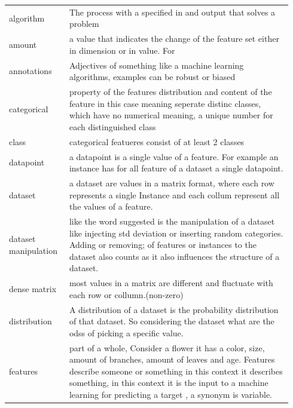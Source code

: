 \documentclass[a4paper,10pt]{article}
\begin{document}
\begin{tabular}{ p{0.20\linewidth} p{0.7437\linewidth} }
	
	
	algorithm & The process with a specified in and output that solves a problem\\ [1ex]
	
	amount & a value that indicates the change of the feature set either in dimension or in value. For \\[1ex]
	
	
	annotations & Adjectives of something like a machine learning algorithms, examples can be robust or biased\\ [1ex]
	
	categorical & property of the features distribution and content of the feature in this case meaning seperate distinc classes, which have no numerical meaning, a unique number for each distinguished class\\ [1ex]
	
	class	 & categorical featueres consist of at least 2 classes\\ [1ex]
	
	datapoint & a datapoint is a single value of a feature. For example an instance has for all feature of a dataset a single datapoint.\\[1ex]
	
	dataset & a dataset are values in a matrix format, where each row represents a single Instance and each collum represent all the values of a feature.\\ [1ex]
	
	dataset manipulation & like the word suggested is the manipulation of a dataset like injecting std deviation or inserting random categories. Adding or removing; of  features or instances to the dataset also counts as it also influences the structure of a dataset. \\ [1ex]
	
	dense matrix & most values in a matrix are different and fluctuate with each row or collumn.(non-zero)\\ [1ex]
	
	distribution & A distribution of a dataset is the probability distribution of that dataset. So considering the dataset what are the odss of picking a specific value. \\ [1ex]
	
	features & part of a whole, Consider a flower it has a color, size, amount of branches, amount of leaves and age. Features describe someone or something in this context it describes something, in this context it is the input to a machine learning for predicting a target , a synonym is variable.\\ [1ex]
	

\end{tabular}
\end{document}
